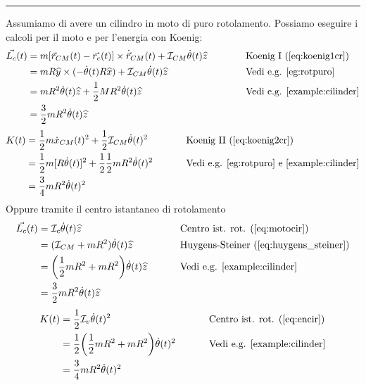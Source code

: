 \noindent\rule[0.5ex]{\linewidth}{.5pt}

\begin{example}
	Assumiamo di avere un cilindro in moto di puro rotolamento. Possiamo eseguire i calcoli per il moto e per l'energia con Koenig:
	\begin{equation*}
		\begin{alignedat}{2}
			\vec{L_c}(t) & = m[\vec{r}_{CM}(t) - \vec{r_c}(t)] \times \dot{\vec{r}}_{CM}(t) + \mathcal{I}_{CM} \dot{\theta}(t) \widehat{z} \qquad\qquad && \text{Koenig I (\ref{eq:koenig1cr})}\\
			& = mR\widehat{y}\times(-\dot{\theta}(t) R \widehat{x}) + \mathcal{I}_{CM}\dot{\theta}(t) \widehat{z} && \text{Vedi e.g. \ref{eg:rotpuro}}\\
			& = mR^2\dot{\theta}(t) \widehat{z} + \frac{1}{2}MR^2\dot{\theta}(t)\widehat{z} && \text{Vedi e.g. \ref{example:cilinder}}\\
			& = \frac{3}{2} m R^2 \dot{\theta}(t) \widehat{z}
		\end{alignedat}
	\end{equation*}
	\begin{equation*}
		\begin{alignedat}{2}
			K(t) & = \frac{1}{2}m\dot{x}_{CM}(t)^2 + \frac{1}{2}\mathcal{I}_{CM}\dot{\theta}(t)^2 \qquad\qquad && \text{Koenig II (\ref{eq:koenig2cr})}\\
			& = \frac{1}{2}m[R\dot{\theta}(t)]^2 + \frac{1}{2}\frac{1}{2}m R^2 \dot{\theta}(t)^2 && \text{Vedi e.g. \ref{eg:rotpuro} e \ref{example:cilinder}}\\
			& = \frac{3}{4}mR^2\dot{\theta}(t)^2
		\end{alignedat}
	\end{equation*}
	Oppure tramite il centro istantaneo di rotolamento
	\begin{equation*}
		\begin{alignedat}{2}
			\vec{L_c}(t) & = \mathcal{I}_c\dot{\theta}(t) \widehat{z} \qquad\qquad\qquad\qquad\qquad && \text{Centro ist. rot. (\ref{eq:motocir})} \\
			& = (\mathcal{I}_{CM}+mR^2) \dot{\theta}(t)\widehat{z} && \text{Huygens-Steiner (\ref{eq:huygens_steiner})}\\
			& = \bigg(\frac{1}{2}mR^2 + mR^2\bigg)\dot{\theta}(t)\widehat{z} && \text{Vedi e.g. \ref{example:cilinder}}\\
			& = \frac{3}{2}mR^2\dot{\theta}(t) \widehat{z}
		\end{alignedat}
	\end{equation*}
	\begin{equation*}
		\begin{alignedat}{2}
			K(t) & = \frac{1}{2} \mathcal{I}_v\dot{\theta}(t)^2 \qquad\qquad\qquad\qquad\qquad && \text{Centro ist. rot. (\ref{eq:encir})}\\
			& = \frac{1}{2}\bigg(\frac{1}{2}mR^2+mR^2\bigg)\dot{\theta}(t)^2 && \text{Vedi e.g. \ref{example:cilinder}}\\
			& = \frac{3}{4}mR^2\dot{\theta}(t)^2
		\end{alignedat}
	\end{equation*}
\end{example}

